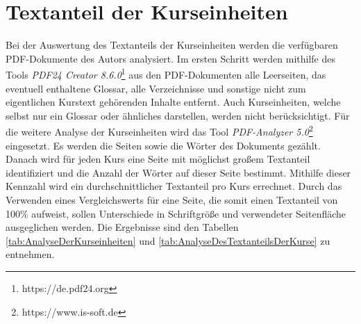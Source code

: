 \section{Textanteil der Kurseinheiten}
\label{sec:TextanteilDerKurseinheiten}
Bei der Auswertung des Textanteils der Kurseinheiten werden die verfügbaren PDF-Dokumente des Autors analysiert. Im ersten Schritt werden mithilfe des Tools \textit{PDF24 Creator 8.6.0}\footnote{https://de.pdf24.org} aus den PDF-Dokumenten alle Leerseiten, das eventuell enthaltene Glossar, alle Verzeichnisse und sonstige nicht zum eigentlichen Kurstext gehörenden Inhalte entfernt. Auch Kurseinheiten, welche selbst nur ein Glossar oder ähnliches darstellen, werden nicht berücksichtigt. Für die weitere Analyse der Kurseinheiten wird das Tool \textit{PDF-Analyzer 5.0}\footnote{https://www.is-soft.de} eingesetzt. Es werden die Seiten sowie die Wörter des Dokuments gezählt. Danach wird für jeden Kurs eine Seite mit möglichst großem Textanteil identifiziert und die Anzahl der Wörter auf dieser Seite bestimmt. Mithilfe dieser Kennzahl wird ein durchschnittlicher Textanteil pro Kurs errechnet. Durch das Verwenden eines Vergleichswerts für eine Seite, die somit einen Textanteil von 100\% aufweist, sollen Unterschiede in Schriftgröße und verwendeter Seitenfläche ausgeglichen werden.
Die Ergebnisse sind den Tabellen \ref{tab:AnalyseDerKurseinheiten} und \ref{tab:AnalyseDesTextanteilsDerKurse} zu entnehmen.

